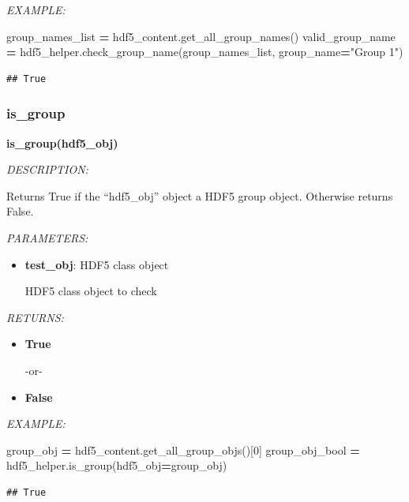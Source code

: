 \documentclass[
]{article}
\newenvironment{Shaded}{\begin{snugshade}}{\end{snugshade}}
\newcommand{\DecValTok}[1]{\textcolor[rgb]{0.00,0.00,0.81}{#1}}
\newcommand{\NormalTok}[1]{#1}
\newcommand{\OperatorTok}[1]{\textcolor[rgb]{0.81,0.36,0.00}{\textbf{#1}}}
\newcommand{\StringTok}[1]{\textcolor[rgb]{0.31,0.60,0.02}{#1}}
\begin{document}
\emph{EXAMPLE:}

\begin{Shaded}
\begin{Highlighting}[]
\NormalTok{group_names_list }\OperatorTok{=}\NormalTok{ hdf5_content.get_all_group_names()}
\NormalTok{valid_group_name }\OperatorTok{=}\NormalTok{ hdf5_helper.check_group_name(group_names_list, group_name}\OperatorTok{=}\StringTok{"Group 1"}\NormalTok{)}
\end{Highlighting}
\end{Shaded}

\begin{verbatim}
## True
\end{verbatim}

\hypertarget{is_group}{%
\subsubsection{is\_group}\label{is_group}}

\textbf{is\_group(hdf5\_obj)}

\emph{DESCRIPTION:}

Returns True if the ``hdf5\_obj'' object a HDF5 group object. Otherwise returns False.

\emph{PARAMETERS:}

\begin{itemize}
\item
  \textbf{test\_obj}: HDF5 class object

  HDF5 class object to check
\end{itemize}

\emph{RETURNS:}

\begin{itemize}
\item
  \textbf{True}

  -or-
\item
  \textbf{False}
\end{itemize}

\emph{EXAMPLE:}

\begin{Shaded}
\begin{Highlighting}[]
\NormalTok{group_obj }\OperatorTok{=}\NormalTok{ hdf5_content.get_all_group_objs()[}\DecValTok{0}\NormalTok{]}
\NormalTok{group_obj_bool }\OperatorTok{=}\NormalTok{ hdf5_helper.is_group(hdf5_obj}\OperatorTok{=}\NormalTok{group_obj)}
\end{Highlighting}
\end{Shaded}

\begin{verbatim}
## True
\end{verbatim}
\end{document}
